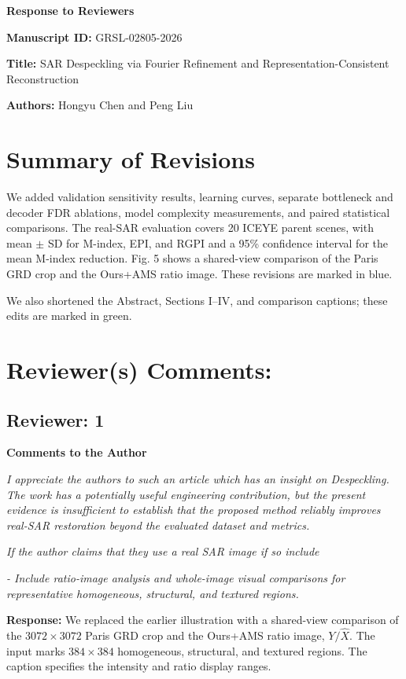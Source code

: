 \documentclass[11pt,letterpaper]{article}
\newcommand{\reviewgroup}[1]{%
  \Needspace{5\baselineskip}%
  \medskip\textit{#1}\par
}
\begin{document}
{\Large\bfseries Response to Reviewers}\par
\textbf{Manuscript ID:} GRSL-02805-2026\par
\textbf{Title:} SAR Despeckling via Fourier Refinement and Representation-Consistent Reconstruction\par
\textbf{Authors:} Hongyu Chen and Peng Liu

\section*{Summary of Revisions}
We added validation sensitivity results, learning curves, separate bottleneck and decoder FDR ablations, model complexity measurements, and paired statistical comparisons. The real-SAR evaluation covers 20 ICEYE parent scenes, with mean $\pm$ SD for M-index, EPI, and RGPI and a 95\% confidence interval for the mean M-index reduction. Fig. 5 shows a shared-view comparison of the Paris GRD crop and the Ours+AMS ratio image. These revisions are marked in blue.

We also shortened the Abstract, Sections I--IV, and comparison captions; these edits are marked in green.

\section*{Reviewer(s) Comments:}
\subsection*{Reviewer: 1}
\textbf{Comments to the Author}

\textit{I appreciate the authors to such an article which has an insight on Despeckling. The work has a potentially useful engineering contribution, but the present evidence is insufficient to establish that the proposed method reliably improves real-SAR restoration beyond the evaluated dataset and metrics.}

\reviewgroup{If the author claims that they use a real SAR image if so include}

\textit{- Include ratio-image analysis and whole-image visual comparisons for representative homogeneous, structural, and textured regions.}

\textbf{Response:} We replaced the earlier illustration with a shared-view comparison of the \(3072\times3072\) Paris GRD crop and the Ours+AMS ratio image, \(Y/\widehat{X}\). The input marks \(384\times384\) homogeneous, structural, and textured regions. The caption specifies the intensity and ratio display ranges.
\end{document}
